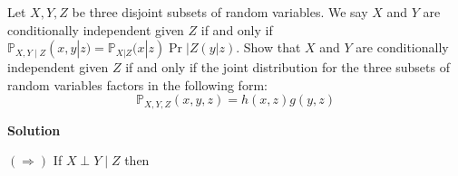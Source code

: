 \documentclass{article}
\begin{document}
\maketitle

\pagebreak

\setcounter{homeworkSectionCounter}{2}
\nobreak{}\nobreak{}

\begin{homeworkProblem}[2][1]

Let $X, Y, Z$ be three disjoint subsets of random variables. We say $X$ and $Y$
are conditionally independent given $Z$ if and only if
$\mathbb{P}_{X, Y \mid Z}(x, y | z)=\mathbb{P}_{X | Z}(x | z) \operatorname{Pr}|Z(y
| z)$.  Show that $X$ and $Y$ are conditionally independent given $Z$ if and
only if the joint distribution for the three subsets of random variables factors
in the following form:
\[
  \mathbb{P}_{X, Y, Z}(x, y, z)=h(x, z) g(y, z)
\]

\textbf{Solution}

$(\Longrightarrow)$ If $ X \perp Y \mid Z$ then

\end{homeworkProblem}
\end{document}
